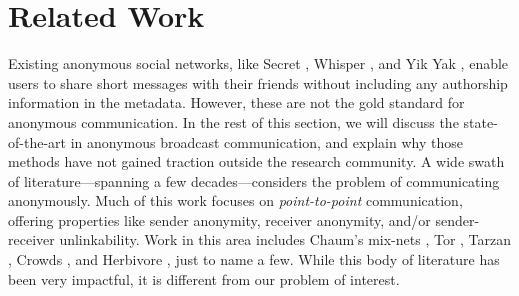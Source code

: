 \section{Related Work}


Existing anonymous social networks, like Secret \cite{secret}, Whisper \cite{whisper}, and Yik Yak \cite{yikyak}, enable users to share short messages with their friends without including any authorship information in the metadata.  However, these are not the gold standard for anonymous communication. In the rest of this section, we will discuss the state-of-the-art in anonymous broadcast communication, and explain why those methods have not gained traction outside the research community.
A wide swath of literature---spanning a few decades---considers the problem of communicating anonymously.
Much of this work focuses on \emph{point-to-point} communication, offering properties like sender anonymity, receiver anonymity, and/or sender-receiver unlinkability. 
Work in this area includes Chaum's mix-nets \cite{chaum1981untraceable}, Tor \cite{tor}, Tarzan \cite{tarzan}, Crowds \cite{reiter1998crowds}, and Herbivore \cite{goel2003herbivore}, just to name a few.
While this body of literature has been very impactful, it is different from our problem of interest.

